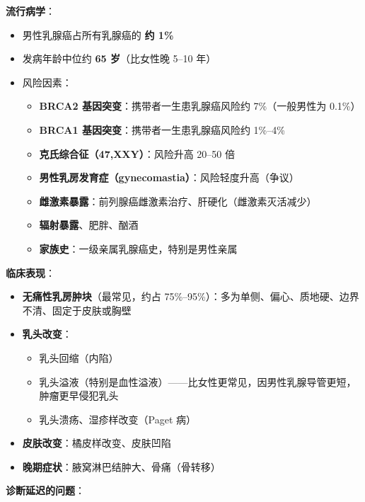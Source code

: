 \documentclass[12pt,a4paper,twoside]{ctexbook}
\begin{document}
\vspace{0.5em}
\noindent\textbf{流行病学}：

\begin{itemize}[leftmargin=2cm]
	\item 男性乳腺癌占所有乳腺癌的 \textbf{约 1\%}
	\item 发病年龄中位约 \textbf{65 岁}（比女性晚 5--10 年）
	\item 风险因素：
	\begin{itemize}
		\item \textbf{BRCA2 基因突变}：携带者一生患乳腺癌风险约 7\%（一般男性为 0.1\%）
		\item \textbf{BRCA1 基因突变}：携带者一生患乳腺癌风险约 1\%--4\%
		\item \textbf{克氏综合征（47,XXY）}：风险升高 20--50 倍
		\item \textbf{男性乳房发育症（gynecomastia）}：风险轻度升高（争议）
		\item \textbf{雌激素暴露}：前列腺癌雌激素治疗、肝硬化（雌激素灭活减少）
		\item \textbf{辐射暴露}、肥胖、酗酒
		\item \textbf{家族史}：一级亲属乳腺癌史，特别是男性亲属
	\end{itemize}
\end{itemize}

\vspace{0.5em}
\noindent\textbf{临床表现}：

\begin{itemize}[leftmargin=2cm]
	\item \textbf{无痛性乳房肿块}（最常见，约占 75\%--95\%）：多为单侧、偏心、质地硬、边界不清、固定于皮肤或胸壁
	\item \textbf{乳头改变}：
	\begin{itemize}
		\item 乳头回缩（内陷）
		\item 乳头溢液（特别是血性溢液）——比女性更常见，因男性乳腺导管更短，肿瘤更早侵犯乳头
		\item 乳头溃疡、湿疹样改变（Paget 病）
	\end{itemize}
	\item \textbf{皮肤改变}：橘皮样改变、皮肤凹陷
	\item \textbf{晚期症状}：腋窝淋巴结肿大、骨痛（骨转移）
\end{itemize}

\vspace{0.5em}
\noindent\textbf{诊断延迟的问题}：
\end{document}
